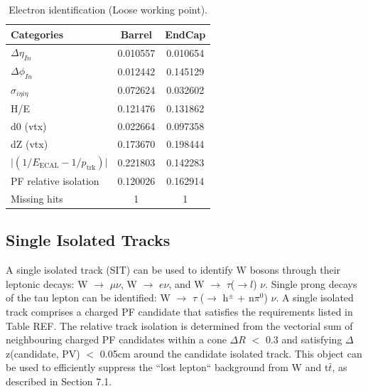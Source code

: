 \begin{table}[h!]
  \caption{Electron identification (Loose working point).\label{tab:ele-id}}
  \centering
  \footnotesize
  \begin{tabular}{ lcc }
    \hline
    \hline
    Categories                                               & Barrel    & EndCap    \\
    \hline
    $\Delta \eta_{In}$                                       & 0.010557  & 0.010654  \\
    $\Delta \phi_{In}$                                       & 0.012442  & 0.145129  \\
    $\sigma_{i\eta i\eta}$                                   & 0.072624  & 0.032602  \\
    H/E                                                      & 0.121476  & 0.131862  \\
    d0 (vtx)                                                 & 0.022664  & 0.097358  \\
    dZ (vtx)                                                 & 0.173670  & 0.198444  \\
    $\lvert(1/E_{\textrm{ECAL}} - 1/p_{\textrm{trk}})\rvert$ & 0.221803  & 0.142283  \\
    PF relative isolation                                    & 0.120026  & 0.162914  \\
    Missing hits                                             & 1         & 1         \\
    \hline
    \hline
  \end{tabular}
  \end{table}


\subsection{Single Isolated Tracks}
\label{sec:SIT}

A single isolated track (SIT) can be used to identify W bosons through their leptonic decays: W $\rightarrow$ $\mu \nu$, W $\rightarrow$ $e\nu$, and W $\rightarrow$ $\tau$($\rightarrow l$) $\nu$. Single prong decays of the tau lepton can be identified: W $\rightarrow$ $\tau$ ($\rightarrow$ h$^{\pm}$ + n$\pi^{0}$) $\nu$. A single isolated track comprises a charged PF candidate that satisfies the requirements listed in Table REF. The relative track isolation is determined from the vectorial sum of neighbouring charged PF candidates within a cone $\Delta R$ $<$ 0.3 and satisfying $\Delta$z(candidate, PV) $<$ 0.05cm around the candidate isolated track.
This object can be used to efficiently suppress the ``lost lepton`` background from W and t$\bar{t}$, as described in Section 7.1. 


